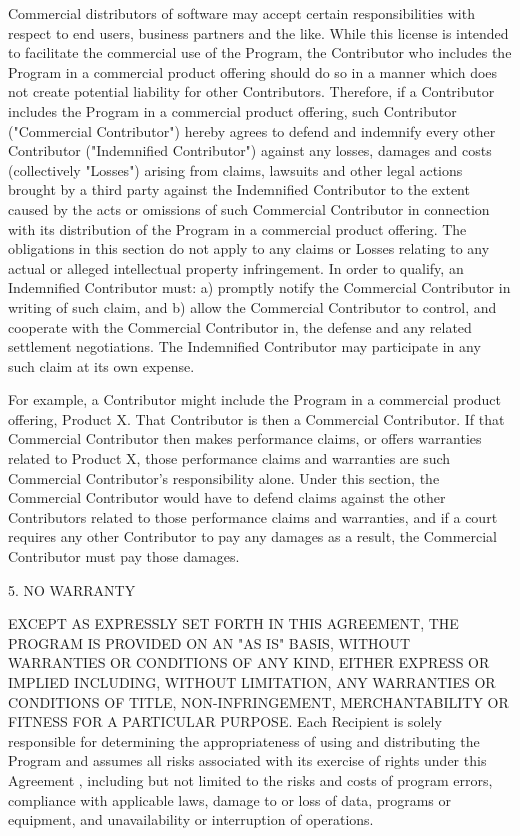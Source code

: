 \documentclass[10pt,letterpaper,titlepage]{article}
\begin{document}
Commercial distributors of software may accept certain responsibilities with respect to end users, business partners and the like. While this license is intended to facilitate the commercial use of the Program, the Contributor who includes the Program in a commercial product offering should do so in a manner which does not create potential liability for other Contributors. Therefore, if a Contributor includes the Program in a commercial product offering, such Contributor ("Commercial Contributor") hereby agrees to defend and indemnify every other Contributor ("Indemnified Contributor") against any losses, damages and costs (collectively "Losses") arising from claims, lawsuits and other legal actions brought by a third party against the Indemnified Contributor to the extent caused by the acts or omissions of such Commercial Contributor in connection with its distribution of the Program in a commercial product offering. The obligations in this section do not apply to any claims or Losses relating to any actual or alleged intellectual property infringement. In order to qualify, an Indemnified Contributor must: a) promptly notify the Commercial Contributor in writing of such claim, and b) allow the Commercial Contributor to control, and cooperate with the Commercial Contributor in, the defense and any related settlement negotiations. The Indemnified Contributor may participate in any such claim at its own expense.

For example, a Contributor might include the Program in a commercial product offering, Product X. That Contributor is then a Commercial Contributor. If that Commercial Contributor then makes performance claims, or offers warranties related to Product X, those performance claims and warranties are such Commercial Contributor's responsibility alone. Under this section, the Commercial Contributor would have to defend claims against the other Contributors related to those performance claims and warranties, and if a court requires any other Contributor to pay any damages as a result, the Commercial Contributor must pay those damages.

5. NO WARRANTY

EXCEPT AS EXPRESSLY SET FORTH IN THIS AGREEMENT, THE PROGRAM IS PROVIDED ON AN "AS IS" BASIS, WITHOUT WARRANTIES OR CONDITIONS OF ANY KIND, EITHER EXPRESS OR IMPLIED INCLUDING, WITHOUT LIMITATION, ANY WARRANTIES OR CONDITIONS OF TITLE, NON-INFRINGEMENT, MERCHANTABILITY OR FITNESS FOR A PARTICULAR PURPOSE. Each Recipient is solely responsible for determining the appropriateness of using and distributing the Program and assumes all risks associated with its exercise of rights under this Agreement , including but not limited to the risks and costs of program errors, compliance with applicable laws, damage to or loss of data, programs or equipment, and unavailability or interruption of operations.
\end{document}
